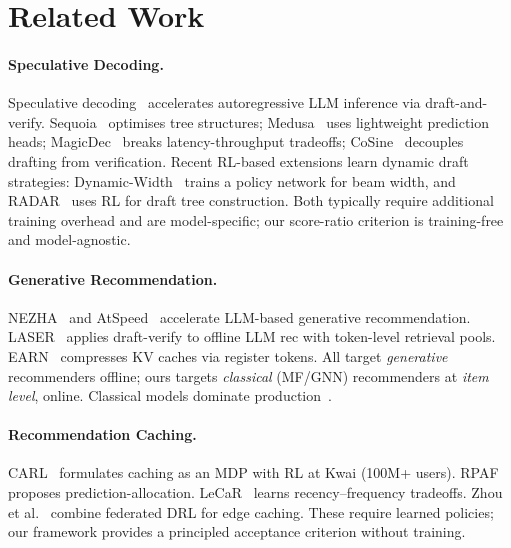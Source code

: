 \documentclass[sigconf,nonacm=false]{acmart}
\begin{document}
\section{Related Work}
\label{sec:related}

\paragraph{Speculative Decoding.}
Speculative decoding~\cite{leviathan2023, chen2023speculative} accelerates autoregressive LLM inference via draft-and-verify. Sequoia~\cite{sequoia2024} optimises tree structures; Medusa~\cite{medusa2024} uses lightweight prediction heads; MagicDec~\cite{magicdec2024} breaks latency-throughput tradeoffs; CoSine~\cite{cosine_spec2025} decouples drafting from verification. Recent RL-based extensions learn dynamic draft strategies: Dynamic-Width~\cite{dynamicwidth2025} trains a policy network for beam width, and RADAR~\cite{radar2025} uses RL for draft tree construction. Both typically require additional training overhead and are model-specific; our score-ratio criterion is training-free and model-agnostic.

\paragraph{Generative Recommendation.}
NEZHA~\cite{nezha2025} and AtSpeed~\cite{atspeed2024} accelerate LLM-based generative recommendation.
LASER~\cite{laser2025} applies draft-verify to offline LLM rec with token-level retrieval pools.
EARN~\cite{earn2025} compresses KV caches via register tokens.
All target \emph{generative} recommenders offline; ours targets \emph{classical} (MF/GNN) recommenders at \emph{item level}, online.
Classical models dominate production~\cite{gnn_recsys_survey2024}.

\paragraph{Recommendation Caching.}
CARL~\cite{carl2024} formulates caching as an MDP with RL at Kwai (100M+ users). RPAF~\cite{rpaf2024} proposes prediction-allocation. LeCaR~\cite{lecar2018} learns recency--frequency tradeoffs. Zhou et al.~\cite{fed_drl_cache2024} combine federated DRL for edge caching. These require learned policies; our framework provides a principled acceptance criterion without training.
\end{document}

